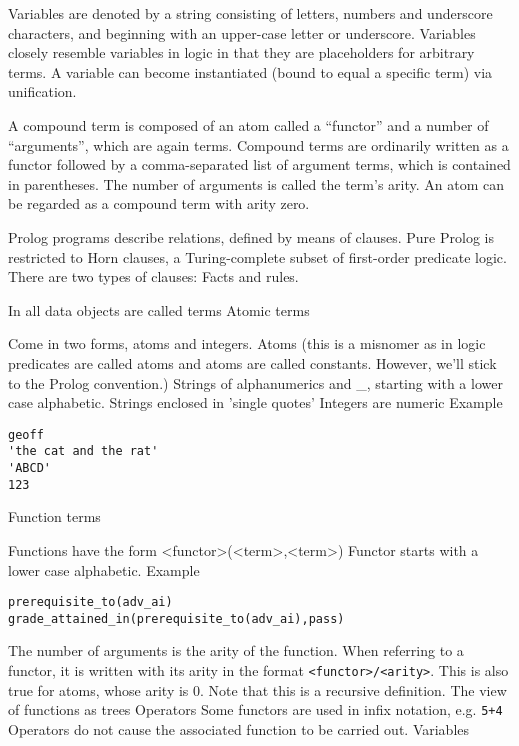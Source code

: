 \documentclass[thesis-solanki.tex]{subfiles}
\begin{document}
\begin{enumerate}
\begin{enumerate}
Variables are denoted by a string consisting of letters, numbers and underscore characters, and beginning with an upper-case letter or 
underscore. Variables closely resemble variables in logic in that they are placeholders for arbitrary terms. A variable can become 
instantiated (bound to equal a specific term) via unification.

A compound term is composed of an atom called a ``functor'' and a number of ``arguments'', which are again terms. Compound terms are ordinarily 
written as a functor followed by a comma-separated list of argument terms, which is contained in parentheses. The number of arguments is 
called the term's arity. An atom can be regarded as a compound term with arity zero.

Prolog programs describe relations, defined by means of clauses. Pure Prolog is restricted to Horn clauses, a Turing-complete subset of 
first-order predicate logic. There are two types of clauses: Facts and rules.



\cite{website:prologintroumiami}
In 
 all data objects are called terms
 Atomic terms

Come in two forms, atoms and integers.
Atoms (this is a misnomer as in logic predicates are called atoms and atoms are called constants. However, we'll stick to the Prolog convention.)
Strings of alphanumerics and \_, starting with a lower case alphabetic.
Strings enclosed in 'single quotes'
Integers are numeric
Example
\par
\begin{verbatim}
geoff
'the cat and the rat'
'ABCD'
123
\end{verbatim}
     
Function terms

Functions have the form <functor>(<term>{,<term>})
Functor starts with a lower case alphabetic.
Example
\par
\begin{verbatim}
prerequisite_to(adv_ai)
grade_attained_in(prerequisite_to(adv_ai),pass)
\end{verbatim}
     
The number of arguments is the arity of the function. When referring to a functor, it is written with its arity in
the format \Verb!<functor>/<arity>!. This is also true for atoms, whose arity is 0.
Note that this is a recursive definition.
The view of functions as trees
Operators
Some functors are used in infix notation, e.g. \Verb!5+4!
Operators do not cause the associated function to be carried out.
Variables


\end{enumerate}
\end{enumerate}
\end{document}
